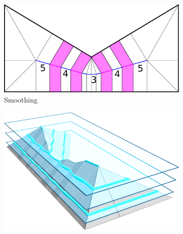 \begin{figure}
\begin{subfigure}{\figwidth}
\includegraphics[width=\figheight]{sources-method-overview-2D-smoothed.pdf}
\caption{Smoothing}\label{3d_surface_overview_smoothed}
\end{subfigure}
\begin{subfigure}{\figwidth}\centering
\hspace*{\tempheightTwo}
\includegraphics[height=\figheight]{sources-method-overview-surface-sliced-cropped.png}

\vspace{\tempheight}


\end{subfigure}
\end{figure}
